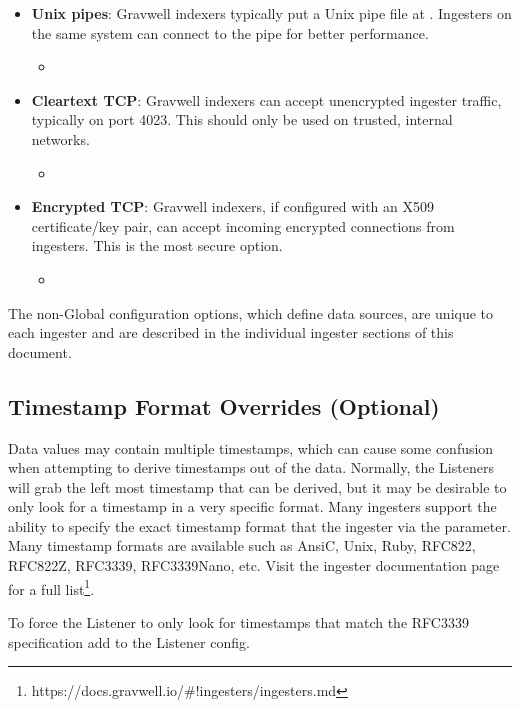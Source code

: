 \begin{itemize}
\item
  \textbf{Unix pipes}: Gravwell indexers typically put a Unix pipe file at
  . Ingesters on the same system can connect
  to the pipe for better performance.
	\begin{itemize}
	\item {}
	\end{itemize}
\item
  \textbf{Cleartext TCP}: Gravwell indexers can accept unencrypted ingester traffic, typically
  on port 4023. This should only be used on trusted, internal networks.
	\begin{itemize}
	\item {}
	\end{itemize}
\item
  \textbf{Encrypted TCP}: Gravwell indexers, if configured with an X509 certificate/key pair,
  can accept incoming encrypted connections from ingesters. This is the
  most secure option.
	\begin{itemize}
	\item {}
	\end{itemize}
\end{itemize}

The non-Global configuration options, which define data sources, are
unique to each ingester and are described in the individual ingester
sections of this document.

\subsection{Timestamp Format Overrides (Optional)}
Data values may contain multiple timestamps, which can cause some
confusion when attempting to derive timestamps out of the data.
Normally, the Listeners will grab the left most timestamp that can be
derived, but it may be desirable to only look for a timestamp in a very
specific format. Many ingesters support the ability to specify the
exact timestamp format that the ingester via the
 parameter. Many timestamp
formats are available such as AnsiC, Unix, Ruby, RFC822, RFC822Z,
RFC3339, RFC3339Nano, etc. Visit the ingester documentation page for a
full list\footnote{https://docs.gravwell.io/\#!ingesters/ingesters.md}.

To force the Listener to only look for timestamps that match the
RFC3339 specification add  to the
Listener config.

